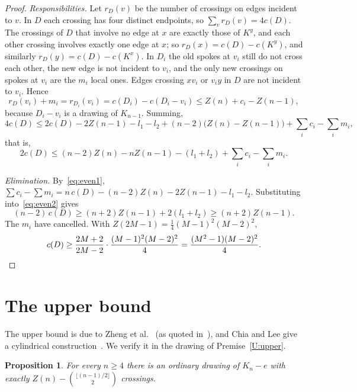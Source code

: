 \documentclass[11pt,a4paper]{article}
\newtheorem{proposition}[theorem]{Proposition}
\theoremstyle{definition}
\theoremstyle{remark}
\numberwithin{equation}{section}
\begin{document}
\begin{proof}
\emph{Responsibilities.} Let $r_D(v)$ be the number of crossings on edges incident to $v$. In $D$ each crossing has four distinct endpoints, so $\sum_vr_D(v)=4c(D)$. The crossings of $D$ that involve no edge at $x$ are exactly those of $K^y$, and each other crossing involves exactly one edge at $x$; so $r_D(x)=c(D)-c(K^y)$, and similarly $r_D(y)=c(D)-c(K^x)$. In $D_i$ the old spokes at $v_i$ still do not cross each other, the new edge is not incident to $v_i$, and the only new crossings on spokes at $v_i$ are the $m_i$ local ones. Edges crossing $xv_i$ or $v_iy$ in $D$ are not incident to $v_i$. Hence
\[
r_D(v_i)+m_i=r_{D_i}(v_i)=c(D_i)-c(D_i-v_i)\le Z(n)+c_i-Z(n-1),
\]
because $D_i-v_i$ is a drawing of $K_{n-1}$. Summing,
\[
4c(D)\le 2c(D)-2Z(n-1)-l_1-l_2+(n-2)\bigl(Z(n)-Z(n-1)\bigr)+\sum_ic_i-\sum_im_i,
\]
that is,
\begin{equation}\label{eq:even2}
2c(D)\le(n-2)Z(n)-nZ(n-1)-(l_1+l_2)+\sum_ic_i-\sum_im_i .
\end{equation}

\emph{Elimination.} By~\eqref{eq:even1}, $\sum c_i-\sum m_i=n\,c(D)-(n-2)Z(n)-2Z(n-1)-l_1-l_2$. Substituting into~\eqref{eq:even2} gives
\[
(n-2)\,c(D)\ge(n+2)Z(n-1)+2(l_1+l_2)\ge(n+2)Z(n-1).
\]
The $m_i$ have cancelled. With $Z(2M-1)=\frac14(M-1)^2(M-2)^2$,
\[
c(D)\ge\frac{2M+2}{2M-2}\cdot\frac{(M-1)^2(M-2)^2}{4}=\frac{(M^2-1)(M-2)^2}{4}. \qedhere
\]
\end{proof}

\section{The upper bound}\label{sec:upper}

The upper bound is due to Zheng et al.~\cite{ZLYC} (as quoted in~\cite[Lemma~2.3]{OWH}), and Chia and Lee give a cylindrical construction~\cite[Lemma~1]{ChiaLee}. We verify it in the drawing of Premise~\ref{U:upper}.

\begin{proposition}\label{prop:upper}
For every $n\ge4$ there is an ordinary drawing of $K_n-e$ with exactly $Z(n)-\binom{\lfloor(n-1)/2\rfloor}{2}$ crossings.
\end{proposition}
\end{document}
